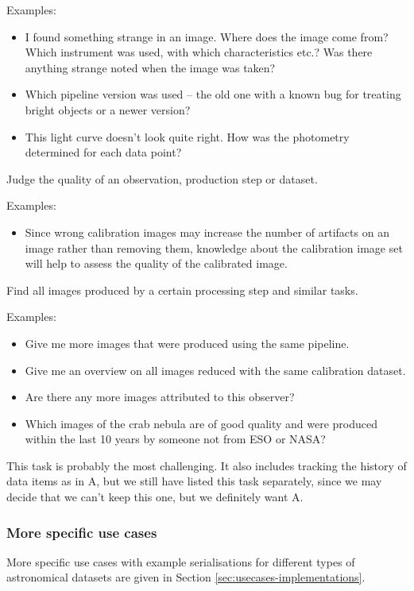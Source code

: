         \noindent Examples:
        \begin{itemize}
            \item I found something strange in an image. Where does
the image come from? Which instrument was used, with which characteristics
etc.? Was there anything strange noted when the image was taken?  
            \item Which pipeline version was used -- the old one
with a known bug for treating bright objects or a newer version?  
            \item This light curve doesn't look quite right. How was
the photometry determined for each data point?  
        \end{itemize}


        Judge the quality of an observation, production step or dataset.
        
        \noindent Examples:
        \begin{itemize}
            \item Since wrong calibration images may increase the
number of artifacts on an image rather than removing them, knowledge about
the calibration image set will help to assess the quality of the calibrated
image.  
        \end{itemize}
      

        Find all images produced by a certain processing step and similar tasks.
        
        \noindent Examples:
        \begin{itemize}
            \item Give me more images that were produced using the
same pipeline.  
            \item Give me an overview on all images reduced with the same calibration dataset.  
            \item Are there any more images attributed to this observer?  
            \item Which images of the crab nebula are of good quality and were produced within the last 10 years by someone not from ESO or NASA?  
        \end{itemize}

        This task is probably the most challenging. It also includes tracking the history of data items as in A, but we still have listed this task separately, since we may decide that we can't keep this one, but we definitely want A.


\subsubsection{More specific use cases}
More specific use cases with example serialisations for different types of astronomical datasets are given in Section \ref{sec:usecases-implementations}.
